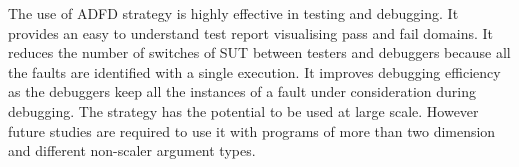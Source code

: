 The use of ADFD strategy is highly effective in testing and debugging. It provides an easy to understand test report visualising pass and fail domains. It reduces the number of switches of SUT between testers and debuggers because all the faults are identified with a single execution. It improves debugging efficiency as the debuggers keep all the instances of a fault under consideration during debugging. The strategy has the potential to be used at large scale. However future studies are required to use it with programs of more than two dimension and different non-scaler argument types.








